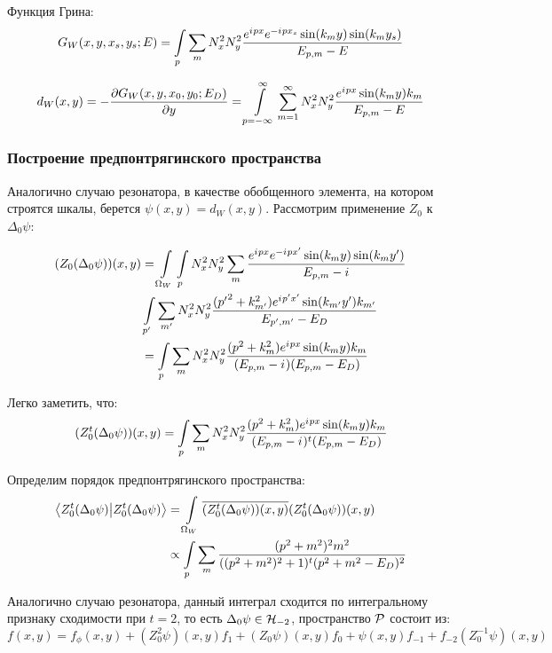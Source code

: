 Функция Грина:
\[
G_W(x, y, x_s, y_s; E) = \int\limits_p \sum\limits_m N_x^2 N_y^2 \frac{e^{{i\mkern1mu} p x} e^{-{i\mkern1mu} p x_s} \sin(k_m y) \sin(k_m y_s)}{E_{p, m} - E}
\]

\begin{align*}
d_W(x, y) = -\pdv{G_W(x, y, x_0, y_0; E_D)}{y} (x, y) = \int\limits_{p = -\infty}^\infty \sum\limits_{m = 1}^\infty N_x^2 N_y^2 \frac{e^{{i\mkern1mu} p x} \sin(k_m y) k_m }{E_{p, m} - E}
\end{align*}

\subsubsection{Построение предпонтрягинского пространства}
Аналогично случаю резонатора, в качестве обобщенного элемента, на котором строятся шкалы, берется $\psi(x, y) = d_W(x, y)$. Рассмотрим применение $Z_0$ к $\Delta_0 \psi$:

\begin{align*}
(Z_0 (\Delta_0 \psi))(x, y)
&= \int\limits_{\Omega_W} \int\limits_p N_x^2 N_y^2 \sum\limits_m \frac{e^{{i\mkern1mu} p x} e^{-{i\mkern1mu} p x'} \sin(k_m y) \sin(k_m y')}{E_{p, m} - {i\mkern1mu}} \\
&  \int\limits_{p'} \sum\limits_{m'} N_x^2 N_y^2  \frac{({p'}^2 + k_{m'}^2) e^{{i\mkern1mu} p' x'} \sin(k_{m'} y') k_{m'} }{E_{p', m'} - E_D} \\
&= \int\limits_p \sum\limits_m N_x^2 N_y^2 \frac{(p^2 + k_m^2) e^{{i\mkern1mu} p x} \sin(k_m y) k_m}{(E_{p, m} - {i\mkern1mu}) (E_{p, m} - E_D)}
\end{align*}

Легко заметить, что:
\begin{align*}
(Z_0^t (\Delta_0 \psi))(x, y) =
\int\limits_p \sum\limits_m N_x^2 N_y^2  \frac{(p^2 + k_m^2) e^{{i\mkern1mu} p x} \sin(k_m y) k_m}{(E_{p, m} - {i\mkern1mu})^t (E_{p, m} - E_D)}
\end{align*}

Определим порядок предпонтрягинского пространства:
\begin{align*}
\ip{Z_0^t (\Delta_0 \psi)}{Z_0^t (\Delta_0 \psi)}
&= \int\limits_{\Omega_W} \cconj{(Z_0^t (\Delta_0 \psi))(x, y)} (Z_0^t (\Delta_0 \psi))(x, y) \\
&\propto \int\limits_p \sum\limits_m \frac{(p^2 + m^2)^2 m^2}{((p^2 + m^2)^{2} + 1)^t (p^2 + m^2 - E_D)^2}
\end{align*}

Аналогично случаю резонатора, данный интеграл сходится по интегральному признаку сходимости при $t = 2$, то есть $\Delta_0 \psi \in \mathcal{H}_{-2}$, пространство $\mathcal{P}$ состоит из:
\[
f(x, y) = f_\phi(x, y) + (Z_0^2 \psi)(x, y) f_1 + (Z_0 \psi)(x, y) f_0 + \psi(x, y) f_{-1} + f_{-2} (Z_0^{-1} \psi)(x, y)
\]

